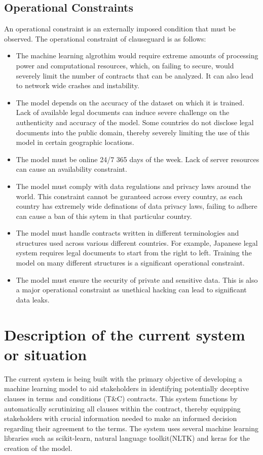 \subsection{Operational Constraints}
An operational constraint is an externally imposed condition that must be observed. The operational constraint of clauseguard is as follows: 
\begin{itemize}
    \item The machine learning algrothim would require extreme amounts of processing power and computational resources, which, on failing to secure, would severely limit the number of contracts that can be analyzed. It can also lead to network wide crashes and instability. 
    \item The model depends on the accuracy of the dataset on which it is trained. Lack of available legal documents can induce severe challenge on the authenticity and accuracy of the model. Some countries do not disclose legal documents into the public domain, thereby severely limiting the use of this model in certain geographic locations. 
    \item The model must be online 24/7 365 days of the week. Lack of server resources can cause an availability constraint. 
    \item The model must comply with data regulations  and privacy laws around the world. This constraint cannot be guranteed across every country, as each country has extremely wide definations of data privacy laws, failing to adhere can cause a ban of this sytem in that particular country. 
    \item The model must handle contracts written in different terminologies and structures used across various different countries. For example, Japanese legal system requires legal documents to start from the right to left. Training the model on many different structures is a significant operational constraint. 
    \item The model must ensure the security of private and sensitive data. This is also a major operational constraint as unethical hacking can lead to significant data leaks. 
    
\end{itemize}

\section{Description of the current system or situation \label{Section::Description of the current system or situation}}
The current system is being built with the primary objective of developing a machine learning model to aid stakeholders in identifying potentially deceptive clauses in terms and conditions (T\&C) contracts. This system functions by automatically scrutinizing all clauses within the contract, thereby equipping stakeholders with crucial information needed to make an informed decision regarding their agreement to the terms.
The system uses several machine learning libraries such as scikit-learn, natural language toolkit(NLTK) and keras for the creation of the model. 

